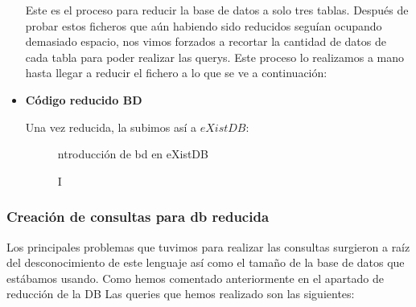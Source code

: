 \documentclass[12pt,a4paper]{article}
\begin{document}
\begin{itemize}
Este es el proceso para reducir la base de datos a solo tres tablas. Después de probar estos ficheros que aún habiendo sido reducidos seguían ocupando demasiado espacio, nos vimos forzados a recortar la cantidad de datos de cada tabla para poder realizar las querys. Este proceso lo realizamos a mano hasta llegar a reducir el fichero a lo que se ve a continuación:


\item \textbf{Código reducido BD}



Una vez reducida, la subimos así a $eXistDB$:

\begin{figure}[!h]
\centering
{}
\caption Introducción de bd en eXistDB
\label{exit1}
\end{figure}

\end{itemize}

\newpage

\subsubsection{Creación de consultas para db reducida} \label{pto422} 

Los principales problemas que tuvimos para realizar las consultas surgieron a raíz del desconocimiento de este lenguaje así como el tamaño de la base de datos que estábamos usando. Como hemos comentado anteriormente en el apartado de reducción de la DB
Las queries que hemos realizado son las siguientes:
\end{document}
